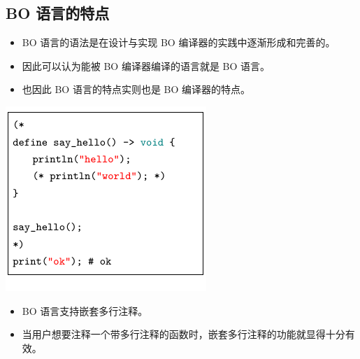 \documentclass[dvipsnames, svgnames, x11names]{beamer}
\begin{document}
\subsection{BO 语言的特点}
\begin{frame}
    \begin{itemize}[<+->]
        \item BO 语言的语法是在设计与实现 BO 编译器的实践中逐渐形成和完善的。
        \item 因此可以认为能被 BO 编译器编译的语言就是 BO 语言。
        \item 也因此 BO 语言的特点实则也是 BO 编译器的特点。
    \end{itemize}
\end{frame}

\begin{frame}

    \begin{minipage}{.45\linewidth}
    \onslide<+-> \includegraphics{../figure/characteristic4.pdf}
    \end{minipage}
    \begin{minipage}{.5\linewidth}
    \begin{itemize}[<+->]
        \item BO 语言支持\alert{嵌套}多行注释。
        \item 当用户想要注释一个带多行注释的函数时，嵌套多行注释的功能就显得十分有效。
    \end{itemize}
    \end{minipage}
\end{frame}
\end{document}
